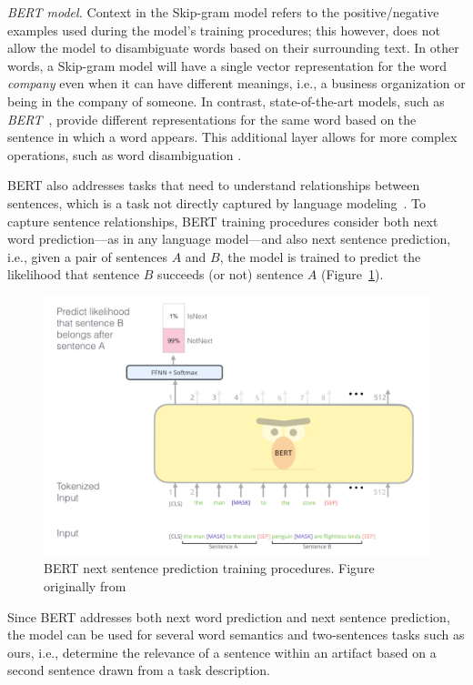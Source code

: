 \medskip
\begin{hangparas}{.0in}{0}
     \textit{BERT model.} Context in the Skip-gram model refers to the positive/negative examples used during the model's training procedures; this however, does not allow the model to disambiguate words based on their surrounding text. In other words, a Skip-gram model will have a single vector representation for the word \textit{company} even when it can have different meanings, i.e., a business organization or being in the company of someone. In contrast, state-of-the-art models, such as \textit{BERT}~\cite{Devlin2018Bert}, provide different representations for the same word based on the sentence in which a word appears.
    This additional layer allows for more complex operations, such as word disambiguation .
\end{hangparas}



BERT also addresses tasks that need to understand relationships between sentences, which is a task not directly captured by language modeling~\cite{Devlin2018Bert}.
To capture sentence relationships, BERT training procedures consider both next word prediction---as in any language model---and also next sentence prediction, i.e., given a pair of sentences $A$ and $B$, the model 
is trained to predict the likelihood that sentence $B$ succeeds (or not) sentence $A$ (Figure~\ref{fig:BERT}). 


\begin{figure}
    \centering
    \includegraphics[width=.75\linewidth]{fig/cp5/BERT}
    \caption{BERT next sentence prediction training procedures. Figure originally from~\cite{jay-alammar-bert}}
    \label{fig:BERT}
\end{figure}



Since BERT addresses both next word prediction and next sentence prediction, the model can be used for several
word semantics and two-sentences tasks such as  ours, i.e., determine the relevance of a sentence within an artifact based on a second sentence drawn from a task description.


